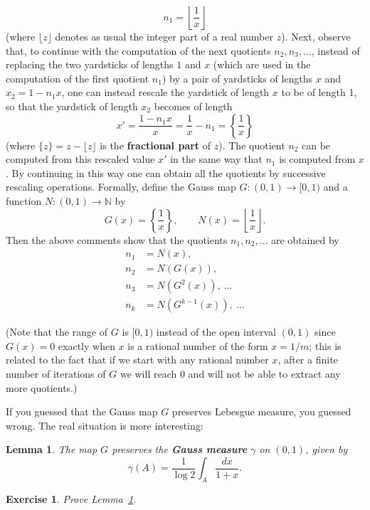 \documentclass[12pt]{article}
\newtheorem{lem}[thm]{Lemma}
\newtheorem{exercise}[thm]{Exercise}
\newcommand{\N}{\mathbb{N}}
\theoremstyle{example}
\begin{document}
\begin{enumerate}[1.]
$$ n_1 = \left\lfloor \frac{1}{x} \right\rfloor $$
(where $\lfloor z \rfloor$ denotes as usual the integer part of a real number $z$). Next, observe that, to continue with the computation of the next quotients $n_2,n_3,\ldots$, instead of replacing the two yardsticks of lengths $1$ and $x$ (which are used in the computation of the first quotient $n_1$) by a pair of yardsticks of lengths $x$ and $x_2=1-n_1 x$, one can instead rescale the yardstick of length $x$ to be of length 1, so that the yardstick of length $x_2$ becomes of length
$$ x'=\frac{1-n_1 x}{x} = \frac{1}{x}-n_1 = \left\{ \frac{1}{x} \right\} $$
(where $\{z\}=z-\lfloor z\rfloor$ is the \textbf{fractional part} of $z$). The quotient $n_2$ can be computed from this rescaled value $x'$ in the same way that $n_1$ is computed from $x$. By continuing in this way one can obtain all the quotients by successive rescaling operations. Formally, define the Gauss map $G:(0,1)\to[0,1)$ and a function $N:(0,1)\to\N$ by
$$
G(x) = \left\{ \frac{1}{x}\right\}, \qquad
N(x) = \left\lfloor \frac{1}{x}\right\rfloor. 
$$
Then the above comments show that the quotients $n_1,n_2,\ldots$ are obtained by
\begin{align*}
n_1 &= N(x), \\
n_2 &= N(G(x)), \\
n_3 &= N(G^2(x)), \ \ldots \\
n_k &= N(G^{k-1}(x)), \ \ldots 
\end{align*}

(Note that the range of $G$ is $[0,1)$ instead of the open interval $(0,1)$ since $G(x)=0$ exactly when $x$ is a rational number of the form $x=1/m$; this is related to the fact that if we start with any rational number $x$, after a finite number of iterations of $G$ we will reach $0$ and will not be able to extract any more quotients.)

If you guessed that the Gauss map $G$ preserves Lebesgue measure, you guessed wrong. The real situation is more interesting:

\begin{lem} \label{lem-gauss-measure}
The map $G$ preserves the \textbf{Gauss measure} $\gamma$ on $(0,1)$, given by
$$ \gamma(A) = \frac{1}{\log 2} \int_A \frac{dx}{1+x}. $$
\end{lem}

\begin{exercise} Prove Lemma~\ref{lem-gauss-measure}.
\end{exercise}




\end{enumerate}
\end{document}
